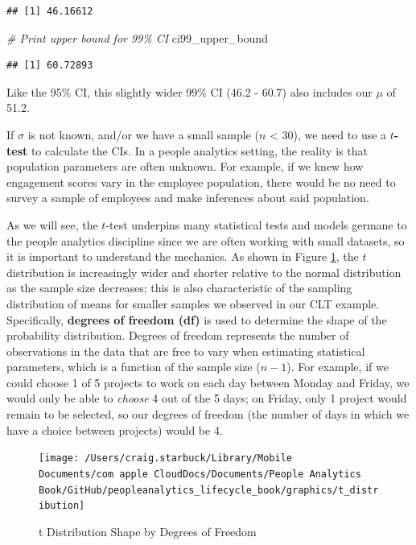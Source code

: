 \documentclass[
]{book}
\newenvironment{Shaded}{\begin{snugshade}}{\end{snugshade}}
\newcommand{\CommentTok}[1]{\textcolor[rgb]{0.56,0.35,0.01}{\textit{#1}}}
\newcommand{\NormalTok}[1]{#1}
\begin{document}
\begin{verbatim}
## [1] 46.16612
\end{verbatim}

\begin{Shaded}
\begin{Highlighting}[]
\CommentTok{\# Print upper bound for 99\% CI}
\NormalTok{ci99\_upper\_bound}
\end{Highlighting}
\end{Shaded}

\begin{verbatim}
## [1] 60.72893
\end{verbatim}

Like the 95\% CI, this slightly wider 99\% CI (46.2 - 60.7) also includes our \(\mu\) of 51.2.

If \(\sigma\) is not known, and/or we have a small sample (\(n\) \textless{} 30), we need to use a \(t\)\textbf{-test} to calculate the CIs. In a people analytics setting, the reality is that population parameters are often unknown. For example, if we knew how engagement scores vary in the employee population, there would be no need to survey a sample of employees and make inferences about said population.

As we will see, the \(t\)-test underpins many statistical tests and models germane to the people analytics discipline since we are often working with small datasets, so it is important to understand the mechanics. As shown in Figure \ref{fig:t-distribution}, the \(t\) distribution is increasingly wider and shorter relative to the normal distribution as the sample size decreases; this is also characteristic of the sampling distribution of means for smaller samples we observed in our CLT example. Specifically, \textbf{degrees of freedom (df)} is used to determine the shape of the probability distribution. Degrees of freedom represents the number of observations in the data that are free to vary when estimating statistical parameters, which is a function of the sample size (\(n - 1\)). For example, if we could choose 1 of 5 projects to work on each day between Monday and Friday, we would only be able to \emph{choose} 4 out of the 5 days; on Friday, only 1 project would remain to be selected, so our degrees of freedom (the number of days in which we have a choice between projects) would be 4.

\begin{figure}

{\centering \texttt{[image: /Users/craig.starbuck/Library/Mobile Documents/com~apple~CloudDocs/Documents/People Analytics Book/GitHub/peopleanalytics\_lifecycle\_book/graphics/t\_distribution]} 

}

\caption{t Distribution Shape by Degrees of Freedom}\label{fig:t-distribution}
\end{figure}
\end{document}
